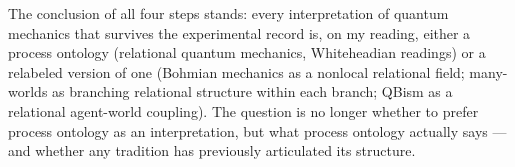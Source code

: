 The conclusion of all four steps stands: every interpretation of quantum
mechanics that survives the experimental record is, on my reading, either
a process ontology (relational quantum mechanics, Whiteheadian readings)
or a relabeled version of one (Bohmian mechanics as a nonlocal relational
field; many-worlds as branching relational structure within each branch;
QBism as a relational agent-world coupling).
The question is no longer whether to prefer process ontology as an
interpretation, but what process ontology actually says --- and whether
any tradition has previously articulated its structure.
